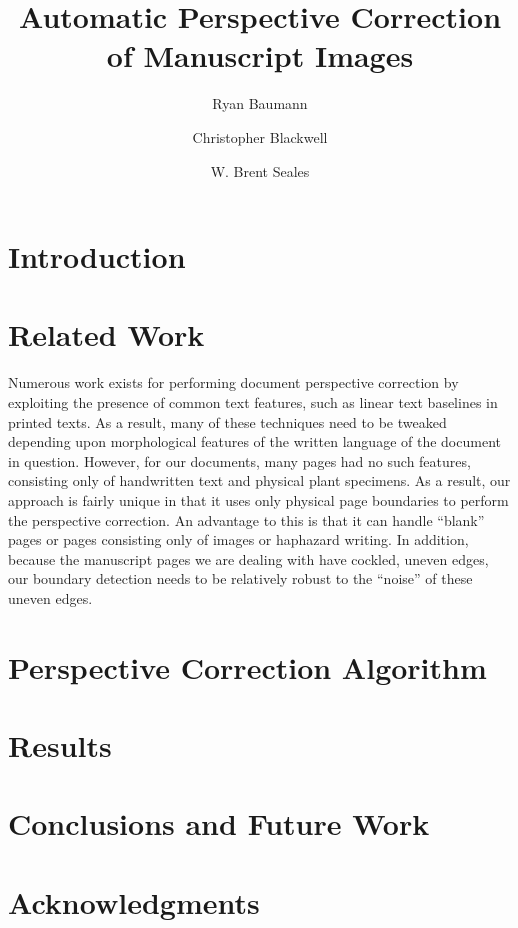 \documentclass[runningheads,a4paper]{llncs}
\begin{document}
\mainmatter

\title{Automatic Perspective Correction of Manuscript Images}

\author{Ryan Baumann \and Christopher Blackwell \and W. Brent Seales}


\maketitle

\section{Introduction}

\section{Related Work}

Numerous work exists for performing document perspective correction by exploiting the presence of
common text features, such as linear text baselines in printed texts.
As a result, many of these techniques need to be tweaked depending upon morphological features of
the written language of the document in question.
However, for our documents,
many pages had no such features, consisting only of handwritten text and physical plant
specimens. As a result, our approach is fairly unique in that it uses only physical page boundaries to
perform the perspective correction. An advantage to this is that it can handle “blank” pages or pages
consisting only of images or haphazard writing. In addition, because the manuscript pages we are dealing with have
cockled, uneven edges, our boundary detection needs to be relatively robust to the “noise” of these uneven edges.

\cite{Bukhari:2009tc}

\section{Perspective Correction Algorithm}

\section{Results}

\section{Conclusions and Future Work}

\section{Acknowledgments}



\end{document}

